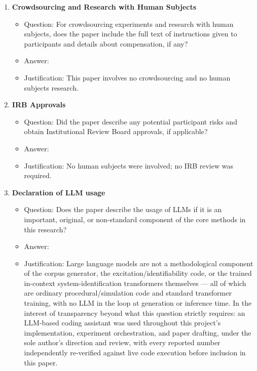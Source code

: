 \documentclass{article}
\begin{document}
\begin{enumerate}
\item {\bf Crowdsourcing and Research with Human Subjects}
  \begin{itemize}
    \item Question: For crowdsourcing experiments and research with human subjects, does the paper include the full text of instructions given to participants and details about compensation, if any?
    \item Answer: \answerNA{}
    \item Justification: This paper involves no crowdsourcing and no human subjects research.
  \end{itemize}

\item {\bf IRB Approvals}
  \begin{itemize}
    \item Question: Did the paper describe any potential participant risks and obtain Institutional Review Board approvals, if applicable?
    \item Answer: \answerNA{}
    \item Justification: No human subjects were involved; no IRB review was required.
  \end{itemize}

\item {\bf Declaration of LLM usage}
  \begin{itemize}
    \item Question: Does the paper describe the usage of LLMs if it is an important, original, or non-standard component of the core methods in this research?
    \item Answer: \answerNA{}
    \item Justification: Large language models are not a methodological component of the corpus generator, the excitation/identifiability code, or the trained in-context system-identification transformers themselves --- all of which are ordinary procedural/simulation code and standard transformer training, with no LLM in the loop at generation or inference time. In the interest of transparency beyond what this question strictly requires: an LLM-based coding assistant was used throughout this project's implementation, experiment orchestration, and paper drafting, under the sole author's direction and review, with every reported number independently re-verified against live code execution before inclusion in this paper.
  \end{itemize}

\end{enumerate}
\end{document}
